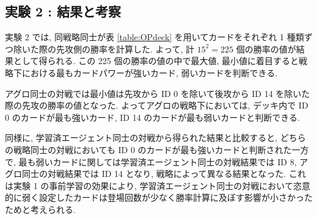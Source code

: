 \documentclass[twocolumn]{jarticle}
\begin{document}
         \subsection{実験 2 : 結果と考察}
         実験 2 では, 同戦略同士が表 \ref{table:OPdeck} を用いてカードをそれぞれ 1 種類ずつ除いた際の先攻側の勝率を計算した. よって, 計 $15^2 = 225$ 個の勝率の値が結果として得られる. この 225 個の勝率の値の中で最大値, 最小値に着目すると戦略下における最もカードパワーが強いカード, 弱いカードを判断できる.
         \par
         アグロ同士の対戦では最小値は先攻から ID 0 を除いて後攻から ID 14 を除いた際の先攻の勝率の値となった. よってアグロの戦略下においては, デッキ内で ID 0 のカードが最も強いカード, ID 14 のカードが最も弱いカードと判断できる. 
         \par
         同様に,  学習済エージェント同士の対戦から得られた結果と比較すると, どちらの戦略同士の対戦においても ID 0 のカードが最も強いカードと判断された一方で, 最も弱いカードに関しては学習済エージェント同士の対戦結果では ID 8, アグロ同士の対戦結果では ID 14 となり, 戦略によって異なる結果となった. これは実験 1 の事前学習の効果により, 学習済エージェント同士の対戦において恣意的に弱く設定したカードは登場回数が少なく勝率計算に及ぼす影響が小さかったためと考えられる. 
      
\end{document}
